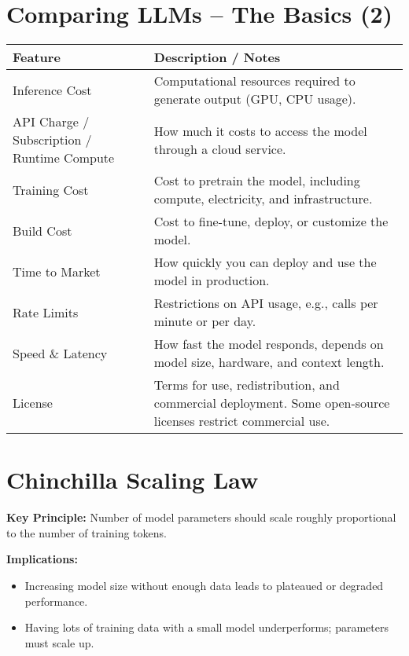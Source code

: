 \documentclass[a4paper, 12pt]{article}
\begin{document}
\vspace{1em}

\section*{Comparing LLMs -- The Basics (2)}

\begin{tabularx}{\textwidth}{|>{\hsize}L|>{\hsize}L|}
\hline
\textbf{Feature} & \textbf{Description / Notes} \\
\hline
Inference Cost & Computational resources required to generate output (GPU, CPU usage). \\
\hline
API Charge / Subscription / Runtime Compute & How much it costs to access the model through a cloud service. \\
\hline
Training Cost & Cost to pretrain the model, including compute, electricity, and infrastructure. \\
\hline
Build Cost & Cost to fine-tune, deploy, or customize the model. \\
\hline
Time to Market & How quickly you can deploy and use the model in production. \\
\hline
Rate Limits & Restrictions on API usage, e.g., calls per minute or per day. \\
\hline
Speed \& Latency & How fast the model responds, depends on model size, hardware, and context length. \\
\hline
License & Terms for use, redistribution, and commercial deployment. Some open-source licenses restrict commercial use. \\
\hline
\end{tabularx}

\vspace{1em}

\section*{Chinchilla Scaling Law}

\textbf{Key Principle:} Number of model parameters should scale roughly proportional to the number of training tokens.

\textbf{Implications:}
\begin{itemize}
    \item Increasing model size without enough data leads to plateaued or degraded performance.
    \item Having lots of training data with a small model underperforms; parameters must scale up.
\end{itemize}
\end{document}
